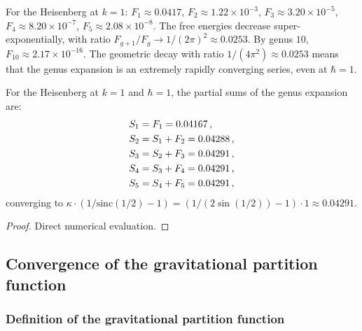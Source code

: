 \begin{remark}
\label{rem:thqg-I-numerical-magnitudes}
For the Heisenberg at $k = 1$: $F_1 \approx 0.0417$, $F_2 \approx 1.22 \times 10^{-3}$, $F_3 \approx 3.20 \times 10^{-5}$, $F_4 \approx 8.20 \times 10^{-7}$, $F_5 \approx 2.08 \times 10^{-8}$. The free energies decrease super-exponentially, with ratio $F_{g+1}/F_g \to 1/(2\pi)^2 \approx 0.0253$. By genus $10$, $F_{10} \approx 2.17 \times 10^{-16}$. The geometric decay with ratio $1/(4\pi^2) \approx 0.0253$ means that the genus expansion is an extremely rapidly converging series, even at $\hbar = 1$.
\end{remark}

\begin{proposition}
\label{prop:thqg-I-partial-sums}
For the Heisenberg at $k = 1$ and $\hbar = 1$, the partial sums of the genus expansion are:
\begin{align}
S_1 &= F_1 = 0.04167\,, \notag \\
S_2 &= S_1 + F_2 = 0.04288\,, \notag \\
S_3 &= S_2 + F_3 = 0.04291\,, \notag \\
S_4 &= S_3 + F_4 = 0.04291\,, \notag \\
S_5 &= S_4 + F_5 = 0.04291\,, \label{eq:thqg-I-partial-sums}
\end{align}
converging to $\kappa \cdot (1/\mathrm{sinc}(1/2) - 1) = (1/(2\sin(1/2)) - 1) \cdot 1 \approx 0.04291$.
\end{proposition}

\begin{proof}
Direct numerical evaluation.
\end{proof}



\subsection{Convergence of the gravitational partition function}
\label{subsec:thqg-I-convergence-grav}

\subsubsection{Definition of the gravitational partition function}

